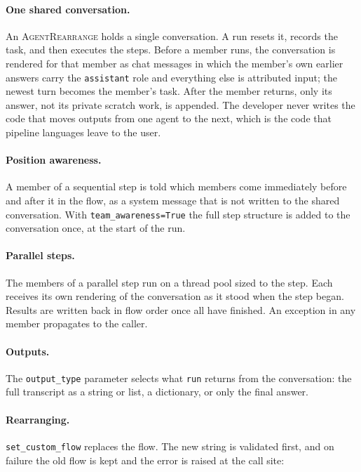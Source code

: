\documentclass[11pt]{article}
\newcommand{\code}[1]{\texttt{#1}}
\newcommand{\AR}{\textsc{AgentRearrange}}
\begin{document}
\paragraph{One shared conversation.}
An \AR{} holds a single conversation. A run resets it, records the task, and then executes the steps. Before a member runs, the conversation is rendered for that member as chat messages in which the member's own earlier answers carry the \code{assistant} role and everything else is attributed input; the newest turn becomes the member's task. After the member returns, only its answer, not its private scratch work, is appended. The developer never writes the code that moves outputs from one agent to the next, which is the code that pipeline languages leave to the user.

\paragraph{Position awareness.}
A member of a sequential step is told which members come immediately before and after it in the flow, as a system message that is not written to the shared conversation. With \code{team\_awareness=True} the full step structure is added to the conversation once, at the start of the run.

\paragraph{Parallel steps.}
The members of a parallel step run on a thread pool sized to the step. Each receives its own rendering of the conversation as it stood when the step began. Results are written back in flow order once all have finished. An exception in any member propagates to the caller.

\paragraph{Outputs.}
The \code{output\_type} parameter selects what \code{run} returns from the conversation: the full transcript as a string or list, a dictionary, or only the final answer.

\paragraph{Rearranging.}
\code{set\_custom\_flow} replaces the flow. The new string is validated first, and on failure the old flow is kept and the error is raised at the call site:
\end{document}
